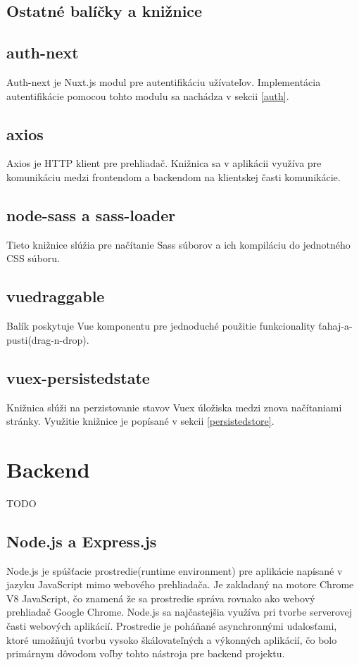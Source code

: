 \subsection{Ostatné balíčky a knižnice}
\subsection*{auth-next}
Auth-next je Nuxt.js modul pre autentifikáciu užívateľov. Implementácia autentifikácie pomocou tohto modulu sa nachádza v sekcii \ref{auth}.

\subsection*{axios}
Axios je HTTP klient pre prehliadač. Knižnica sa v aplikácii využíva pre komunikáciu medzi frontendom a backendom na klientskej časti komunikácie. 

\subsection*{node-sass a sass-loader}
Tieto knižnice slúžia pre načítanie Sass súborov a ich kompiláciu do jednotného CSS súboru.

\subsection*{vuedraggable}
Balík poskytuje Vue komponentu pre jednoduché použitie funkcionality ťahaj-a-pusti(drag-n-drop).

\subsection*{vuex-persistedstate}
Knižnica slúži na perzistovanie stavov Vuex úložiska medzi znova načítaniami stránky. Využitie knižnice je popísané v sekcii \ref{persistedstore}.

\section{Backend}
TODO

\subsection{Node.js a Express.js}
\label{node}
Node.js\cite{nodejs} je spúšťacie prostredie(runtime environment) pre aplikácie napísané v jazyku JavaScript mimo webového prehliadača. Je zakladaný na motore Chrome V8 JavaScript, čo znamená že sa prostredie správa rovnako ako webový prehliadač Google Chrome. Node.js sa najčastejšia využíva pri tvorbe serverovej časti webových aplikácií. Prostredie je poháňané asynchronnými udalosťami, ktoré umožňujú tvorbu vysoko škálovateľných a výkonných aplikácií, čo bolo primárnym dôvodom voľby tohto nástroja pre backend projektu.


